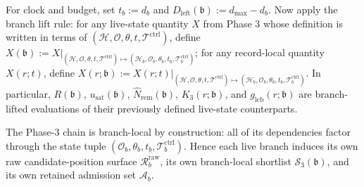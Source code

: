 \documentclass[11pt]{article}
\begin{document}
For clock and budget, set \(t_b:=d_b\) and \(D_{\mathrm{left}}(\mathfrak b):=d_{\max}-d_b\). Now apply the branch lift rule: for any live-state quantity \(X\) from Phase 3 whose definition is written in terms of \((\mathcal H,\mathcal O,\theta,t,\mathcal T^{\mathrm{ctrl}})\), define \(X(\mathfrak b):=X\big|_{(\mathcal H,\mathcal O,\theta,t,\mathcal T^{\mathrm{ctrl}})\mapsto(\mathcal H_b,\mathcal O_b,\theta_b,t_b,\mathcal T_b^{\mathrm{ctrl}})}\); for any record-local quantity \(X(r;t)\), define \(X(r;\mathfrak b):=X(r;t)\big|_{(\mathcal H,\mathcal O,\theta,t,\mathcal T^{\mathrm{ctrl}})\mapsto(\mathcal H_b,\mathcal O_b,\theta_b,t_b,\mathcal T_b^{\mathrm{ctrl}})}\). In particular, \(R(\mathfrak b)\), \(u_{\mathrm{sat}}(\mathfrak b)\), \(\widehat N_{\mathrm{rem}}(\mathfrak b)\), \(K_3(r;\mathfrak b)\), and \(g_{\mathrm{lcb}}(r;\mathfrak b)\) are branch-lifted evaluations of their previously defined live-state counterparts.

The Phase-3 chain is branch-local by construction: all of its dependencies factor through the state tuple \((\mathcal O_b,\theta_b,t_b,\mathcal T_b^{\mathrm{ctrl}})\). Hence each live branch induces its own raw candidate-position surface \(\mathcal R_b^{\mathrm{raw}}\), its own branch-local shortlist \(\mathcal S_3(\mathfrak b)\), and its own retained admission set \(\mathcal A_b\).
\end{document}
